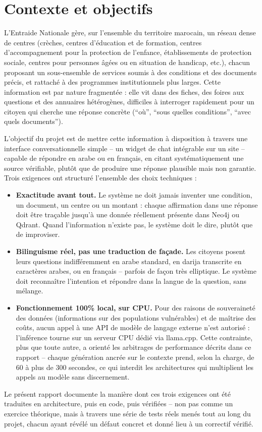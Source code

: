 \section{Contexte et objectifs}

L'Entraide Nationale gère, sur l'ensemble du territoire marocain, un réseau dense de centres (crèches, centres d'éducation et de formation, centres d'accompagnement pour la protection de l'enfance, établissements de protection sociale, centres pour personnes âgées ou en situation de handicap, etc.), chacun proposant un sous-ensemble de services soumis à des conditions et des documents précis, et rattaché à des programmes institutionnels plus larges. Cette information est par nature fragmentée : elle vit dans des fiches, des foires aux questions et des annuaires hétérogènes, difficiles à interroger rapidement pour un citoyen qui cherche une réponse concrète (``où'', ``sous quelles conditions'', ``avec quels documents'').

L'objectif du projet est de mettre cette information à disposition à travers une interface conversationnelle simple -- un widget de chat intégrable sur un site -- capable de répondre en arabe ou en français, en citant systématiquement une source vérifiable, plutôt que de produire une réponse plausible mais non garantie. Trois exigences ont structuré l'ensemble des choix techniques :

\begin{itemize}
\item \textbf{Exactitude avant tout.} Le système ne doit jamais inventer une condition, un document, un centre ou un montant : chaque affirmation dans une réponse doit être traçable jusqu'à une donnée réellement présente dans Neo4j ou Qdrant. Quand l'information n'existe pas, le système doit le dire, plutôt que de improviser.
\item \textbf{Bilinguisme réel, pas une traduction de façade.} Les citoyens posent leurs questions indifféremment en arabe standard, en darija transcrite en caractères arabes, ou en français -- parfois de façon très elliptique. Le système doit reconnaître l'intention et répondre dans la langue de la question, sans mélange.
\item \textbf{Fonctionnement 100\% local, sur CPU.} Pour des raisons de souveraineté des données (informations sur des populations vulnérables) et de maîtrise des coûts, aucun appel à une API de modèle de langage externe n'est autorisé : l'inférence tourne sur un serveur CPU dédié via llama.cpp. Cette contrainte, plus que toute autre, a orienté les arbitrages de performance décrits dans ce rapport -- chaque génération ancrée sur le contexte prend, selon la charge, de 60 à plus de 300 secondes, ce qui interdit les architectures qui multiplient les appels au modèle sans discernement.
\end{itemize}

Le présent rapport documente la manière dont ces trois exigences ont été traduites en architecture, puis en code, puis vérifiées -- non pas comme un exercice théorique, mais à travers une série de tests réels menés tout au long du projet, chacun ayant révélé un défaut concret et donné lieu à un correctif vérifié.
